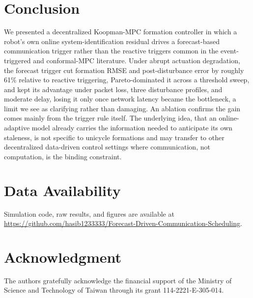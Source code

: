\documentclass[10pt,conference]{IEEEtran}
\begin{document}
\section{Conclusion}

We presented a decentralized Koopman-MPC formation controller in which a robot's own online system-identification residual drives a forecast-based communication trigger rather than the reactive triggers common in the event-triggered and conformal-MPC literature. Under abrupt actuation degradation, the forecast trigger cut formation RMSE and post-disturbance error by roughly 61\% relative to reactive triggering, Pareto-dominated it across a threshold sweep, and kept its advantage under packet loss, three disturbance profiles, and moderate delay, losing it only once network latency became the bottleneck, a limit we see as clarifying rather than damaging. An ablation confirms the gain comes mainly from the trigger rule itself. The underlying idea, that an online-adaptive model already carries the information needed to anticipate its own staleness, is not specific to unicycle formations and may transfer to other decentralized data-driven control settings where communication, not computation, is the binding constraint.

\section*{Data Availability}

Simulation code, raw results, and figures are available at \url{https://github.com/hasib1233333/Forecast-Driven-Communication-Scheduling}.

\section*{Acknowledgment}

The authors gratefully acknowledge the financial support of the Ministry of Science and Technology of Taiwan through its grant 114-2221-E-305-014.
\end{document}
